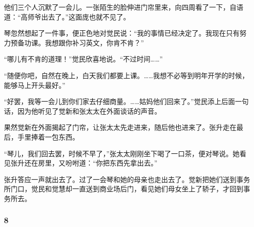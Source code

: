 \par 他们三个人沉默了一会儿。一张陌生的脸伸进门帘里来，向四周看了一下，自语道：“高师爷出去了。”这面庞也就不见了。
\par 琴忽然想起了一件事，便正色地对觉民说：“我的事情已经决定了。我现在只有努力预备功课。我想跟你补习英文，你肯不肯？”
\par “哪儿有不肯的道理！”觉民欣喜地说。“不过时间……”
\par “随便你吧，自然在晚上，白天我们都要上课。……我想不必等到明年开学的时候，能够马上开头最好。”
\par “好罢，我等一会儿到你们家去仔细商量。……姑妈他们回来了。”觉民添上后面一句话，因为他听见了觉新和张太太在外面谈话的声音。
\par 果然觉新在外面揭起了门帘，让张太太先走进来，随后他也进来了。张升走在最后，手里捧着一包东西。
\par “琴儿，我们回去罢，时候不早了，”张太太刚刚坐下喝了一口茶，便对琴说。她看见张升还在房里，又吩咐道：“你把东西先拿出去。”
\par 张升答应一声就出去了。过了一会琴和她的母亲也走出去了。觉新把她们送到事务所门口，觉民和觉慧却一直送到商业场后门，看见她们母女坐上了轿子，才回到事务所去。

\subsubsection*{8}


